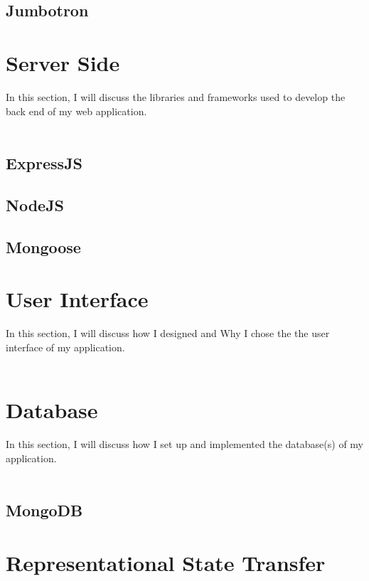 \subsection{Jumbotron}

\section{Server Side}

In this section, I will discuss the libraries and frameworks used to develop the back end of my web application.\\ \\

\subsection{ExpressJS}

\subsection{NodeJS}

\subsection{Mongoose}

\section{User Interface}

In this section, I will discuss how I designed and Why I chose the the user interface of my application.\\ \\

\section{Database}

In this section, I will discuss how I set up and implemented the database(s) of my application.\\ \\

\subsection{MongoDB}

\section{Representational State Transfer}

